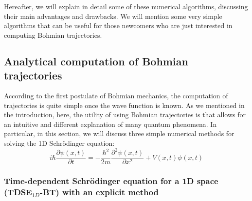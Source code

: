 \documentclass[nofootinbib, secnumarabic, amsmath, nobibnotes,10pt,aps,pra]{revtex4-1}
\begin{document}
Hereafter, we will explain in detail some of these numerical
algorithms, discussing their main advantages and drawbacks. We will
mention some very simple algorithms that can be useful for those
newcomers who are just interested in computing Bohmian trajectories.\enlargethispage{-1pc}

\subsection{Analytical computation of Bohmian trajectories}

According to the first postulate of Bohmian mechanics, the
computation of trajectories is quite simple once the wave function
is known.  As we mentioned in the introduction, here, the utility of
using Bohmian trajectories is that allows for an intuitive and different
explanation of many quantum phenomena. In particular, in this
section, we will discuss three simple numerical methods for
solving the 1D Schr\"odinger equation:
\begin{equation}
\label{om.Schrodinger1Dappendix}
i \hbar \frac{\partial \psi(x,t)} {\partial t} = -\frac {\hbar^2} {2m} \frac{ {\partial}^2 \psi(x,t)} {\partial x^2} + V(x,t) \psi(x,t)
\end{equation}

\subsubsection{Time-dependent Schr\"odinger equation for a 1D space (TDSE$_{1D}$-BT) with an explicit method}
\label{timedependentexplicit}
\end{document}
